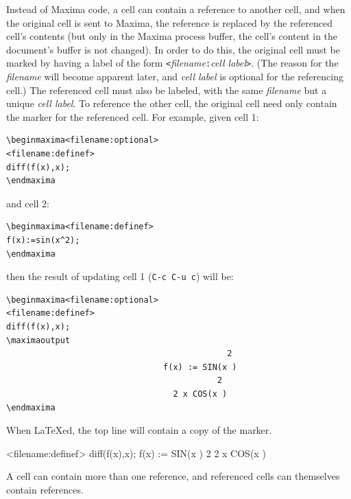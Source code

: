 \noindent
Instead of Maxima code, a cell can contain a reference to another cell,
and when the original cell is sent to Maxima, the reference is replaced
by the referenced cell's contents (but only in the Maxima process
buffer, the cell's 
content in the document's buffer is not changed).  In order to do
this, the original cell must be marked by having a label of the form
\texttt{<}\textsl{filename}\texttt{:}\textsl{cell label}\texttt{>}.
(The reason for the \textsl{filename} will become apparent later, and
\textsl{cell label} is optional for the referencing cell.)
The referenced cell must also be labeled, with the same
\textsl{filename} but a unique \textsl{cell label}.  To reference the
other cell, the original cell need only contain the marker for the
referenced cell.  For example, given cell 1:
\begin{verbatim}
\beginmaxima<filename:optional>
<filename:definef>
diff(f(x),x);
\endmaxima
\end{verbatim}
\noindent
and cell 2:
\begin{verbatim}
\beginmaxima<filename:definef>
f(x):=sin(x^2);
\endmaxima
\end{verbatim}
\noindent
then the result of updating cell 1 (\texttt{C-c C-u c}) will be:
\begin{verbatim}
\beginmaxima<filename:optional>
<filename:definef>
diff(f(x),x);
\maximaoutput
                                             2
                                f(x) := SIN(x )
                                           2
                                  2 x COS(x )
\endmaxima
\end{verbatim}
\noindent
When \LaTeX{}ed, the top line will contain a copy of the marker.

<filename:definef>
diff(f(x),x);
                                f(x) := SIN(x )
                                           2
                                  2 x COS(x )
\endmaxima

A cell can contain more than one reference, and referenced cells can
themselves contain references.  

